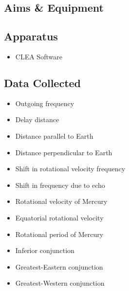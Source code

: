 \documentclass[11pt]{article}
\begin{document}
\begin{multicols}{2}

\section{Aims \& Equipment}


\subsection{Apparatus}

\begin{itemize}
	\item CLEA Software
\end{itemize}


\subsection{Data Collected}\label{Data Collected}

\begin{itemize}
	\item Outgoing frequency
	\item Delay distance
    \item Distance parallel to Earth
    \item Distance perpendicular to Earth
    \item Shift in rotational velocity frequency
    \item Shift in frequency due to echo
	\item Rotational velocity of Mercury
    \item Equatorial rotational velocity
    \item Rotational period of Mercury
    \item Inferior conjunction
    \item Greatest-Eastern conjunction
    \item Greatest-Western conjunction
\end{itemize}


\end{multicols}
\end{document}

